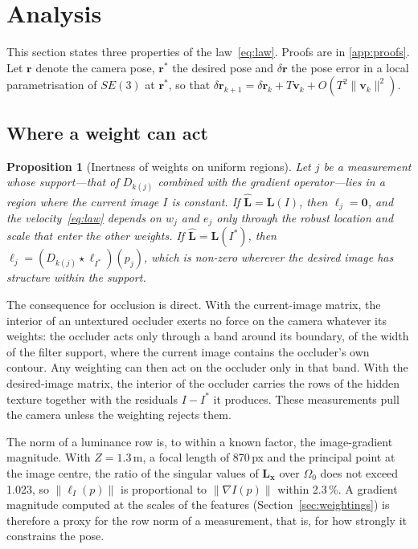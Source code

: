 \documentclass[preprint,12pt]{elsarticle}
\newtheorem{proposition}{Proposition}
\theoremstyle{remark}
\newcommand{\Lh}{\widehat{\mathbf{L}}}
\newcommand{\vc}{\mathbf{v}}
\newcommand{\dr}{\delta\mathbf{r}}
\begin{document}
\section{Analysis}
\label{sec:analysis}

This section states three properties of the law~\eqref{eq:law}. Proofs are in
\ref{app:proofs}. Let $\mathbf{r}$ denote the camera pose, $\mathbf{r}^{*}$ the
desired pose and $\dr$ the pose error in a local parametrisation of $SE(3)$ at
$\mathbf{r}^{*}$, so that $\dr_{k+1}=\dr_{k}+T\vc_{k}+O(T^{2}\lVert\vc_{k}\rVert^{2})$.

\subsection{Where a weight can act}

\begin{proposition}[Inertness of weights on uniform regions]
\label{prop:inert}
Let $j$ be a measurement whose support---that of $D_{k(j)}$ combined with the
gradient operator---lies in a region where the current image $I$ is constant.
If $\Lh=\mathbf{L}(I)$, then $\boldsymbol{\ell}_{j}=\mathbf{0}$, and the
velocity~\eqref{eq:law} depends on $w_{j}$ and $e_{j}$ only through the robust
location and scale that enter the other weights. If $\Lh=\mathbf{L}(I^{*})$,
then $\boldsymbol{\ell}_{j}=(D_{k(j)}\star\boldsymbol{\ell}_{I^{*}})(p_{j})$,
which is non-zero wherever the desired image has structure within the support.
\end{proposition}

The consequence for occlusion is direct. With the current-image matrix, the
interior of an untextured occluder exerts no force on the camera whatever its
weights: the occluder acts only through a band around its boundary, of the
width of the filter support, where the current image contains the occluder's
own contour. Any weighting can then act on the occluder only in that band.
With the desired-image matrix, the interior of the occluder carries the rows of
the hidden texture together with the residuals $I-I^{*}$ it produces. These
measurements pull the camera unless the weighting rejects them.

The norm of a luminance row is, to within a known factor, the image-gradient
magnitude. With $Z=1.3$\,m, a focal length of 870\,px and the principal point
at the image centre, the ratio of the singular values of
$\mathbf{L}_{\mathbf{x}}$ over $\Omega_{0}$ does not exceed 1.023, so
$\lVert\boldsymbol{\ell}_{I}(p)\rVert$ is proportional to
$\lVert\nabla I(p)\rVert$ within 2.3\,\%. A gradient magnitude computed at the
scales of the features (Section~\ref{sec:weightings}) is therefore a proxy for
the row norm of a measurement, that is, for how strongly it constrains the
pose.
\end{document}
